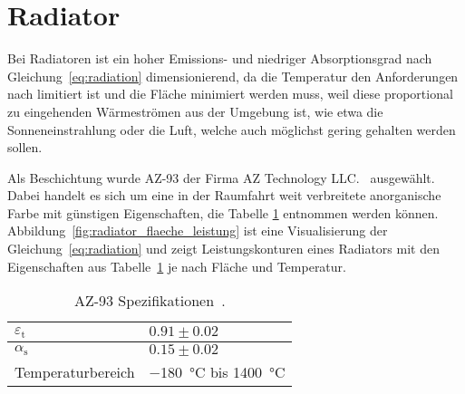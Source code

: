 \section{Radiator}\label{sec:Radiator}

Bei Radiatoren ist ein hoher Emissions- und niedriger Absorptionsgrad nach Gleichung~\ref{eq:radiation} dimensionierend, da die Temperatur den Anforderungen nach limitiert ist
und die Fläche minimiert werden muss, weil diese proportional zu eingehenden Wärmeströmen aus der Umgebung ist, wie etwa die Sonneneinstrahlung oder die Luft, welche auch möglichst gering gehalten werden sollen.

Als Beschichtung wurde AZ-93 der Firma AZ Technology LLC.~\cite{AZ-Technology} ausgewählt. Dabei handelt es sich um eine in der Raumfahrt
weit verbreitete anorganische Farbe mit günstigen Eigenschaften, die Tabelle \ref{tab:az-93_eigenschaften} entnommen werden können.
Abbildung~\ref{fig:radiator_flaeche_leistung} ist eine Visualisierung der Gleichung~\ref{eq:radiation} und zeigt Leistungskonturen eines
Radiators mit den Eigenschaften aus Tabelle~\ref{tab:az-93_eigenschaften} je nach Fläche und Temperatur.

\begin{table}

  \centering
  \caption{AZ-93 Spezifikationen~\cite{AZ-Technology}.}\label{tab:az-93_eigenschaften}

  \begin{tabular}{ll}

    \toprule[1pt]
    $\varepsilon_{\text{t}}$ & $0.91 \pm 0.02$ \\

    \midrule[0.5pt]
    $\alpha_{\text{s}}$ & $0.15 \pm 0.02$ \\

    \midrule[0.5pt]
    Temperaturbereich  & \SI{-180}{\degreeCelsius} bis \SI{1400}{\degreeCelsius} \\

    \bottomrule[1pt]
  \end{tabular}
\end{table}

